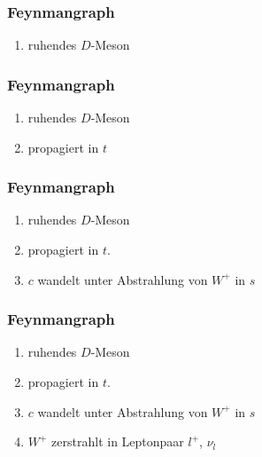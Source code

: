 \documentclass[hyperref={pdfpagelabels=false}]{beamer}
\begin{document}
 \begin{frame}
  \frametitle{Feynmangraph}
   \setcounter{framenumber}{4}
 \begin{minipage}[h]{0.38\textwidth}
  \begin{enumerate}
   \item ruhendes $D$-Meson
 \end{enumerate}
 \end{minipage}
 \begin{minipage}[h]{0.58\textwidth}

 \end{minipage}
 \end{frame}
 
 \begin{frame}
  \frametitle{Feynmangraph}
 \setcounter{framenumber}{4}
 \begin{minipage}[h]{0.38\textwidth}
  \begin{enumerate}
   \item ruhendes $D$-Meson
   \item propagiert in $t$
  \end{enumerate}
 \end{minipage}
 \begin{minipage}[h]{0.58\textwidth}
 \end{minipage}
 \end{frame}
 
 \begin{frame}
  \frametitle{Feynmangraph}
  \setcounter{framenumber}{4}
 \begin{minipage}[h]{0.38\textwidth}
  \begin{enumerate}
   \item ruhendes $D$-Meson
   \item propagiert in $t$.
   \item $c$ wandelt unter Abstrahlung von $W^+$ in $s$ 
  \end{enumerate}
 \end{minipage}
 \begin{minipage}[h]{0.58\textwidth}

 \end{minipage}
 \end{frame}
 
 \begin{frame}
  \frametitle{Feynmangraph}
  \setcounter{framenumber}{4}
 \begin{minipage}[h]{0.38\textwidth}
  \begin{enumerate}
   \item ruhendes $D$-Meson
   \item propagiert in $t$.
   \item $c$ wandelt unter Abstrahlung von $W^+$ in $s$
   \item $W^+$ zerstrahlt in Leptonpaar $l^+$, $\nu_l$
  \end{enumerate}
 \end{minipage}
 \begin{minipage}[h]{0.58\textwidth}

 \end{minipage}
 \end{frame}
 
\end{document}
